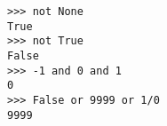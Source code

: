 \begin{lstlisting}
>>> not None
True
>>> not True
False
>>> -1 and 0 and 1
0
>>> False or 9999 or 1/0
9999
\end{lstlisting}
